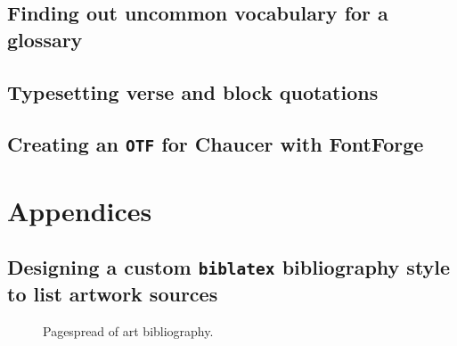 \documentclass[16pt,letter,oneside,usenames,dvipsnames]{memoir}
\newcommand\biblatex{\texttt{biblatex}\xspace}%
\begin{document}
\chapter{Finding out uncommon vocabulary for a glossary}

\chapter{Typesetting verse and block quotations}

\chapter{Creating an \texttt{OTF} for Chaucer with FontForge}

\part{Appendices}

\chapter{Designing a custom \biblatex bibliography style to list artwork sources}

\begin{figure}
  \centering
  \qquad\begin{minipage}{0.3\textwidth}%
  \end{minipage}%
  \quad\begin{minipage}{0.3\textwidth}%
  \end{minipage}%
  \caption{\footnotesize{}Pagespread of art bibliography.}
\end{figure}
\end{document}
